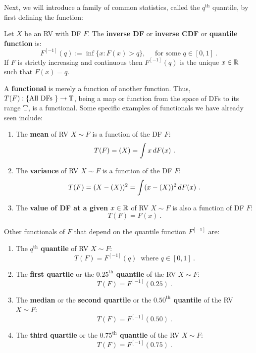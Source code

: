 Next, we will introduce a family of common statistics, called the $q^{\text{th}}$ quantile, by first defining the function:
\begin{definition}
Let $X$ be an RV with DF $F$.  The {\bf inverse DF} or {\bf inverse CDF} or {\bf quantile function} is:
\begin{equation}\label{E:InverseCDF}
F^{[-1]}(q) := \inf { \{ x: F(x) > q \}}, \quad \text{ for some $q \in [0,1]$} \ .
\end{equation} 
If $F$ is strictly increasing and continuous then $F^{[-1]}(q)$ is the unique $x \in \mathbb{R}$ such that $F(x)=q$.
\end{definition}
A {\bf functional} is merely a function of another function.  Thus, $T(F): \{ \text{All DFs }\} \to \mathbb{T}$, being a map or function from the space of DFs to its range $\mathbb{T}$, is a functional.  Some specific examples of functionals we have already seen include:
\begin{enumerate}
\item The {\bf mean} of RV $X \sim F$ is a function of the DF $F$:  
\[
T(F) = \E(X) = \int x\,dF(x) \ .
\]
\item The {\bf variance} of RV $X \sim F$ is a function of the DF $F$:  
\[
T(F) = \mathscr{(}X-\mathscr{(}X))^2 = \int (x-\mathscr{(}X))^2\,dF(x) \ .
\]
\item The {\bf value of DF at a given $x \in \mathbb{R}$} of RV $X \sim F$ is also a function of DF $F$:
\[
T(F) = F(x) \  .
\]
\end{enumerate}
Other functionals of $F$ that depend on the quantile function $F^{[-1]}$ are:
\begin{enumerate}
\item The {\bf $q^{\text{th}}$ quantile} of RV $X \sim F$: 
\[
T(F) = F^{[-1]}(q) \ \text{ where } q \in [0,1] \ .
\]
\item The {\bf first quartile} or the {\bf $0.25^{\text{th}}$ quantile} of the RV $X \sim F$: 
\[
T(F) = F^{[-1]}(0.25) \ .
\]
\item The {\bf median} or the {\bf second quartile} or the {\bf $0.50^{\text{th}}$ quantile} of the RV $X \sim F$: 
\[
T(F) = F^{[-1]}(0.50) \  .
\]
\item The {\bf third quartile} or the {\bf $0.75^{\text{th}}$ quantile} of the RV $X \sim F$: 
\[
T(F) = F^{[-1]}(0.75) \ .
\]
\end{enumerate}

